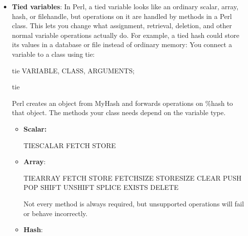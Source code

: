 \documentclass{report}
\begin{document}
\begin{itemize}
        \item \textbf{Tied variables}: In Perl, a tied variable looks like an ordinary scalar, array, hash, or filehandle, but operations on it are handled by methods in a Perl class.
            \bigbreak \noindent 
            This lets you change what assignment, retrieval, deletion, and other normal variable operations actually do.
            \bigbreak \noindent 
            For example, a tied hash could store its values in a database or file instead of ordinary memory:
            \bigbreak \noindent 
            You connect a variable to a class using tie:
            \bigbreak \noindent 
            \begin{perlcode}
                tie VARIABLE, CLASS, ARGUMENTS;
            \end{perlcode}
            \bigbreak \noindent 
            \begin{perlcode}
            tie %
            \end{perlcode}
            \bigbreak \noindent 
            Perl creates an object from MyHash and forwards operations on \%hash to that object.
            \bigbreak \noindent 
            The methods your class needs depend on the variable type.
            \begin{itemize}
                \item \textbf{Scalar:}
                    \bigbreak \noindent 
                    \begin{perlcode}
                        TIESCALAR
                        FETCH
                        STORE
                    \end{perlcode}
                \item \textbf{Array}: 
                    \bigbreak \noindent 
                    \begin{perlcode}
                        TIEARRAY
                        FETCH
                        STORE
                        FETCHSIZE
                        STORESIZE
                        CLEAR
                        PUSH
                        POP
                        SHIFT
                        UNSHIFT
                        SPLICE
                        EXISTS
                        DELETE
                    \end{perlcode}
                    \bigbreak \noindent 
                    Not every method is always required, but unsupported operations will fail or behave incorrectly.
                \item \textbf{Hash}: 

\end{itemize}
\end{itemize}
\end{document}
